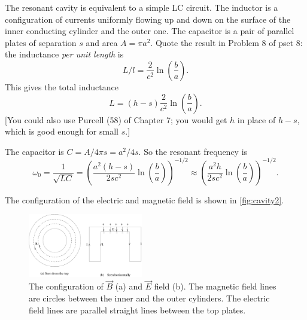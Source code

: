 \documentclass[makesolutionspdf]{esg8022pset}
\begin{document}
\begin{solution}
  The resonant cavity is equivalent to a simple LC circuit.  The
  inductor is a configuration of currents uniformly flowing up and down 
  on the surface of the inner conducting cylinder and the outer one.
  The capacitor is a pair of parallel plates of separation $s$ and area
  $A=\pi a^2$.  Quote the result in Problem 8 of pset 8: the inductance
  \emph{per unit length} is
  \[ L/l =\frac{2}{c^2}\ln{(\frac{b}{a})}.\]
  This gives the total inductance 
  \[ L= (h-s)\frac{2}{c^2}\ln{(\frac{b}{a})}.\]
  [You could also use Purcell (58) of Chapter 7; you would get $h$ in place of $h-s$, which is good enough 
  for small $s$.]

  The capacitor is $C= A/4\pi s= a^2/4s$.  So the resonant frequency is
  \begin{equation}
  \omega_0=\frac{1}{\sqrt{LC}}= \left(\frac{a^2
  (h-s)}{2sc^2}\ln(\frac{b}{a})\right)^{-1/2}
  \approx  \left(\frac{a^2
  h}{2sc^2}\ln(\frac{b}{a})\right)^{-1/2}.
  \end{equation}

  The configuration of the electric and magnetic field is shown in
  \autoref{fig:cavity2}.

  \begin{figure}[H]
    \centering
    \includegraphics[width = 5cm]{cavity2}
    \caption{The configuration of $\vec{B}$ (a) and $\vec{E}$ field (b).
      The magnetic field lines are circles between the inner and the outer
      cylinders.  The electric field lines are parallel straight lines
      between the top plates.}
    \label{fig:cavity2}
  \end{figure}

\end{solution}
\end{document}
